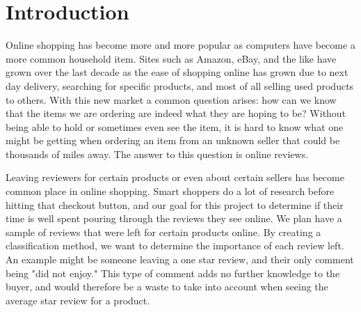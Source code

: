 \section{Introduction}
Online shopping has become more and more popular as computers have become a more common household item. Sites such as Amazon, eBay, and the like have grown over  the last decade as the ease of shopping online has grown due to next day delivery, searching for specific products, and most of all selling used products to others. With this new market a common question arises: how can we know that the items we are ordering are indeed what they are hoping to be? Without being able to hold or sometimes even see the item, it is hard to know what one might be getting when ordering an item from an unknown seller that could be thousands of miles away. The answer to this question is online reviews.

Leaving reviewers for certain products or even about certain sellers has become common place in online shopping. Smart shoppers do a lot of research before hitting that checkout button, and our goal for this project to determine if their time is well spent pouring through the reviews they see online. We plan have a sample of reviews that were left for certain products online. By creating a classification method, we want to determine the importance of each review left. An example might be someone leaving a one star review, and their only comment being "did not enjoy." This type of comment adds no further knowledge to the buyer, and would therefore be a waste to take into account when seeing the average star review for a product.  
